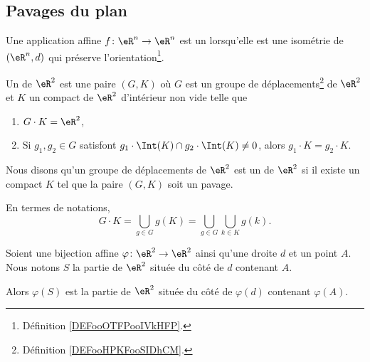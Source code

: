 
\subsection{Pavages du plan}

\begin{definition}      \label{DEFooHPKFooSIDhCM}
    Une application affine \( f\colon \eR^n\to \eR^n\) est un  lorsqu'elle est une isométrie de \( (\eR^n,d)\) qui préserve l'orientation\footnote{Définition \ref{DEFooOTFPooIVkHFP}.}.
\end{definition}

\begin{definition}      \label{DEFooJPHKooRgCBJs}
    Un  de \( \eR^2\) est une paire \( (G,K)\) où \( G\) est un groupe de déplacements\footnote{Définition \ref{DEFooHPKFooSIDhCM}.} de \( \eR^2\) et \( K\) un compact de \( \eR^2\) d'intérieur non vide telle que
    \begin{enumerate}
        \item
            \( G\cdot K=\eR^2\),
        \item       \label{ITEMooOIJZooZMKLUm}
            Si \( g_1,g_2\in G\) satisfont \( g_1\cdot \Int(K)\cap g_2\cdot\Int(K)\neq 0\), alors \( g_1\cdot K=g_2\cdot K\).
    \end{enumerate}
    Nous disons qu'un groupe de déplacements de \( \eR^2\) est un  de \( \eR^2\) si il existe un compact \( K\) tel que la paire \( (G,K)\) soit un pavage.
\end{definition}

En termes de notations,
\begin{equation}
    G\cdot K=\bigcup_{g\in G}g(K)=\bigcup_{g\in G}\bigcup_{k\in K}g(k).
\end{equation}

\begin{lemma}        \label{LEMooWZSWooZYkICn}
    Soient une bijection affine \( \varphi\colon \eR^2\to \eR^2\) ainsi qu'une droite \( d\) et un point \( A\). Nous notons \( S\) la partie de \( \eR^2\) située du côté de \( d\) contenant \( A\).

    Alors \( \varphi(S)\) est la partie de \( \eR^2\) située du côté de \( \varphi(d)\) contenant \( \varphi(A)\).
\end{lemma}

